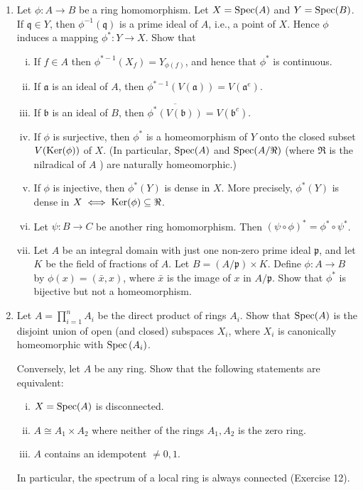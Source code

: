 \documentclass[class=book, crop=false]{standalone}
\theoremstyle{definition}
\theoremstyle{remark}
\begin{document}
\begin{enumerate}[resume*=exc1]
  \item Let $\phi: A \to B$ be a ring homomorphism. Let
        $X=\operatorname{Spec}(A)$ and $Y=\operatorname{Spec}(B)$. If
        $\mathfrak{q} \in Y$, then $\phi^{-1}(\mathfrak{q})$ is a prime ideal of $A$,
        i.e., a point of $X$. Hence $\phi$ induces a mapping
        $\phi^{*}: Y \to X$. Show that
\begin{enumerate}[i)]
  \item If $f \in A$ then $\phi^{*-1}\left(X_{f}\right)=Y_{\phi(f)}$, and hence that
$\phi^{*}$ is continuous.
  \item If $\mathfrak{a}$ is an ideal of $A$, then
$\phi^{*-1}(V(\mathfrak{a}))=V\left(\mathfrak{a}^{e}\right)$.
  \item If $\mathfrak{b}$ is an ideal of $B$, then
$\overline{\phi^{*}(V(\mathfrak{b}))}=V\left(\mathfrak{b}^{c}\right)$.
  \item If $\phi$ is surjective, then $\phi^{*}$ is a homeomorphism of $Y$ onto the
closed subset $V(\operatorname{Ker}(\phi))$ of $X$. (In particular,
$\operatorname{Spec}(A)$ and $\operatorname{Spec}(A / \Re)$ (where $\Re$ is the
nilradical of $A$ ) are naturally homeomorphic.)
  \item If $\phi$ is injective, then $\phi^{*}(Y)$ is dense in $X$. More precisely,
$\phi^{*}(Y)$ is dense in
$X \iff \operatorname{Ker}(\phi) \subseteq \Re$.
  \item Let $\psi: B \to C$ be another ring homomorphism. Then
$(\psi \circ \phi)^{*}=\phi^{*} \circ \psi^{*}$.
  \item Let $A$ be an integral domain with just one non-zero prime ideal
$\mathfrak{p}$, and let $K$ be the field of fractions of $A$. Let
$B=(A / \mathfrak{p}) \times K$. Define $\phi: A \to B$ by
$\phi(x)=(\bar{x}, x)$, where $\bar{x}$ is the image of $x$ in
$A / \mathfrak{p}$. Show that $\phi^{*}$ is bijective but not a homeomorphism.
\end{enumerate}

  \item Let $A=\prod_{i=1}^{n} A_{i}$ be the direct product of rings $A_{i}$.
        Show that $\operatorname{Spec}(A)$ is the disjoint union of open (and
        closed) subspaces $X_{i}$, where $X_{i}$ is canonically homeomorphic
        with $\operatorname{Spec}\left(A_{i}\right)$.

        Conversely, let $A$ be any
        ring. Show that the following statements are equivalent:
        \begin{enumerate}[i)]
          \item $X=\operatorname{Spec}(A)$ is disconnected.
          \item $A \cong A_{1} \times A_{2}$ where neither of the rings $A_{1}, A_{2}$ is
the zero ring.
          \item $A$ contains an idempotent $\neq 0,1$.
        \end{enumerate}
In particular, the spectrum of a local ring is always connected (Exercise 12).


\end{enumerate}
\end{document}
